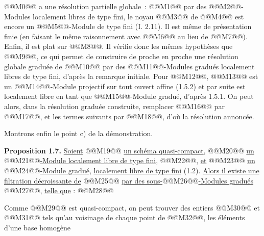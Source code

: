 
@@M0@@ a une
résolution partielle globale~:
@@M1@@
par des @@M2@@-Modules localement libres de type fini, le noyau @@M3@@ de @@M4@@ est encore un @@M5@@-Module de type fini (I. 2.11). Il est même de présentation finie (en faisant le même raisonnement avec @@M6@@ au lieu de @@M7@@). Enfin, il est plat sur @@M8@@. Il vérifie donc les mêmes hypothèses que @@M9@@, ce qui permet de construire de proche en proche une résolution globale graduée de @@M10@@ par des @@M11@@-Modules gradués localement libres de type fini, d'après la remarque initiale. Pour @@M12@@, @@M13@@ est un @@M14@@-Module projectif sur tout ouvert affine (1.5.2) et par suite est localement libre en tant que @@M15@@-Module gradué, d'après 1.5.1. On peut alors, dans la résolution graduée construite, remplacer @@M16@@ par @@M17@@, et les termes suivants par @@M18@@, d'où la résolution annoncée.

Montrons enfin le point c) de la démonstration.

\textbf{Proposition 1.7.} \uline{Soient} @@M19@@ \uline{un schéma quasi-compact}, @@M20@@ \uline{un} @@M21@@\uline{-Module localement libre de type fini}, @@M22@@, \uline{et} @@M23@@ \uline{un} @@M24@@\uline{-Module gradué}, \uline{localement libre de type fini} (1.2). \uline{Alors il existe une filtration décroissante de} @@M25@@ \uline{par des sous-}@@M26@@\uline{-Modules gradués} @@M27@@, \uline{telle que} :
@@M28@@

Comme @@M29@@ est quasi-compact, on peut trouver des entiers @@M30@@ et @@M31@@ tels qu'au voisinage de chaque point de @@M32@@, les éléments d'une base homogène 

